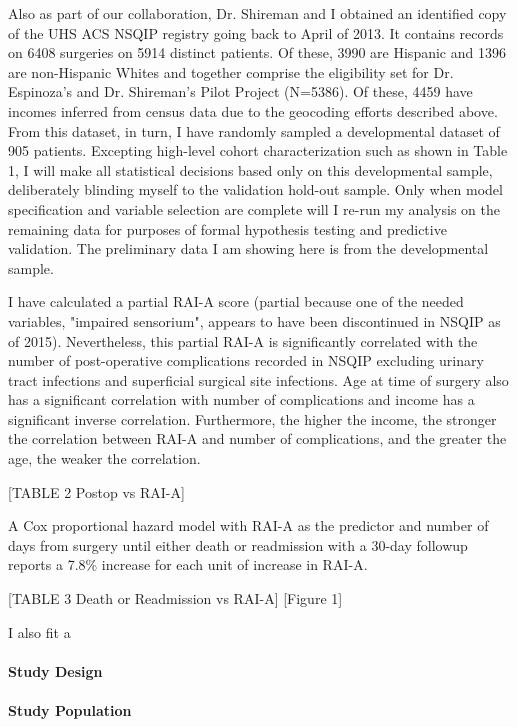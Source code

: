 Also as part of our collaboration, Dr. Shireman and I obtained an identified copy of the UHS ACS NSQIP registry going back to April of 2013. It contains records on 6408 surgeries on 5914 distinct patients. Of these, 3990 are Hispanic and 1396 are non-Hispanic Whites and together comprise the eligibility set for Dr. Espinoza's and Dr. Shireman's Pilot Project (N=5386). Of these, 4459 have incomes inferred from census data due to the geocoding efforts described above. From this dataset, in turn, I have randomly sampled a developmental dataset of 905 patients. Excepting high-level cohort characterization such as shown in Table 1, I will make all statistical decisions based only on this developmental sample, deliberately blinding myself to the validation hold-out sample. Only when model specification and variable selection are complete will I re-run my analysis on the remaining data for purposes of formal hypothesis testing and predictive validation. The preliminary data I am showing here is from the developmental sample.

I have calculated a partial RAI-A score (partial because one of the needed variables, "impaired sensorium", appears to have been discontinued in NSQIP as of 2015). Nevertheless, this partial RAI-A is significantly correlated with the number of post-operative complications recorded in NSQIP excluding urinary tract infections and superficial surgical site infections. Age at time of surgery also has a significant correlation with number of complications and income has a significant inverse correlation. Furthermore, the higher the income, the stronger the correlation between RAI-A and number of complications, and the greater the age, the weaker the correlation.

[TABLE 2 Postop vs RAI-A]

A Cox proportional hazard model with RAI-A as the predictor and number of days from surgery until either death or readmission with a 30-day followup reports a 7.8\% increase for each unit of increase in RAI-A.

[TABLE 3 Death or Readmission vs RAI-A] [Figure 1]

I also fit a 


\paragraph{Study Design}\label{study-design}


\paragraph{Study Population}\label{study-population}



